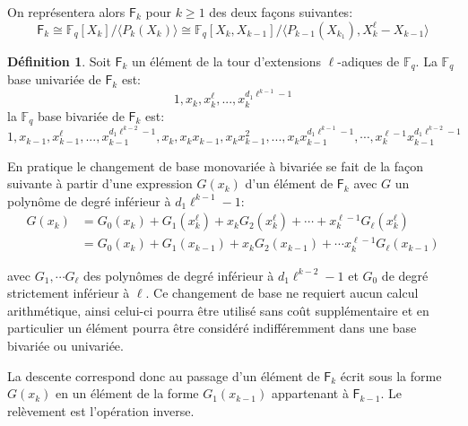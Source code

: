 \documentclass[10pt,a4paper]{book}
\theoremstyle{plain}
\theoremstyle{definition}
\theoremstyle{definition}
\theoremstyle{definition}
\theoremstyle{definition}
\newtheorem{defi}[thm]{Définition}
\theoremstyle{remark}
\theoremstyle{remark}
\theoremstyle{definition}
\begin{document}
On représentera alors $\mathsf{F}_k$ pour $k\geqslant1$ des deux façons suivantes:
\begin{equation*}
\mathsf{F}_k \cong \mathbb{F}_q[X_k]/\langle P_k(X_k) \rangle \cong \mathbb{F}_q[X_k,X_{k-1}]/\langle P_{k-1}(X_{k_1}), X_k^{\ell}-X_{k-1}  \rangle
\end{equation*}
  
\begin{defi}
Soit $\mathsf{F}_k$ un élément de la tour d'extensions $\ell$-adiques de $\mathbb{F}_q$.
La $\mathbb{F}_q$ base univariée de $\mathsf{F}_k$ est:
\begin{equation*}
1,x_k,x_k^{\ell},...,x_k^{d_1\ell^{k-1}-1}
\end{equation*}
la $\mathbb{F}_q$ base bivariée de $\mathsf{F}_k$ est:
\begin{equation*}
1,x_{k-1},x_{k-1}^{\ell},...,x_{k-1}^{d_1\ell^{k-2}-1},x_k,x_kx_{k-1},x_kx_{k-1}^2,...,x_kx_{k-1}^{d_1\ell^{k-1}-1}, \cdots, x_k^{\ell-1}x_{k-1}^{d_1\ell^{k-2}-1}
\end{equation*}
\end{defi}

En pratique le changement de base monovariée à bivariée se fait de la façon suivante à partir d'une expression $G(x_k)$ d'un élément de $\mathsf{F}_k$ avec $G$ un polynôme de degré inférieur à $d_1\ell^{k-1}-1$: 
\begin{equation*}
\begin{alignedat}{1}
 G(x_k) &= G_0(x_k)+ G_1(x_k^\ell)+x_kG_2(x_k^\ell)+ \cdots + x_k^{\ell-1} G_{\ell}(x_k^{\ell})\\
&= G_0(x_k)+G_1(x_{k-1})+x_kG_2(x_{k-1})+ \cdots x_k^{\ell-1}G_{\ell}(x_{k-1})
\end{alignedat}
\end{equation*}

avec $G_1, \cdots G_{\ell}$ des polynômes de degré inférieur à $d_1\ell^{k-2}-1$ et $G_0$ de degré strictement inférieur à $\ell$. Ce changement de base ne requiert aucun calcul arithmétique, ainsi celui-ci pourra être utilisé sans coût supplémentaire et en particulier un élément pourra être considéré indifféremment dans une base bivariée ou univariée.%

La descente correspond donc au passage d'un élément de $\mathsf{F}_k$ écrit sous la forme $G(x_k)$ en un élément de la forme $G_1(x_{k-1})$ appartenant à $\mathsf{F}_{k-1}$. Le relèvement est l'opération inverse.
\end{document}
